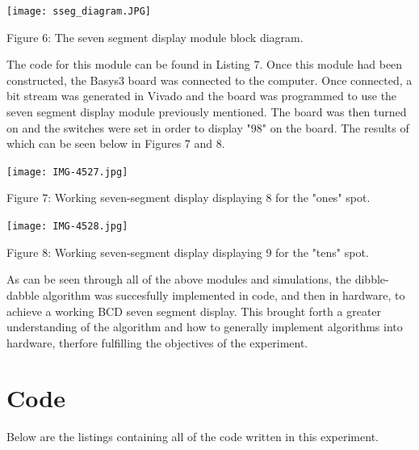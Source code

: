 \documentclass[11pt]{article}
\newcommand{\Verilog}[2][]{%
	
}
\begin{document}
\begin{center}
	\texttt{[image: sseg\_diagram.JPG]}
	
	Figure 6: The seven segment display module block diagram.
	
	
\end{center}

The code for this module can be found in Listing 7. Once this module had been constructed, the Basys3 board was connected to the computer. Once connected, a bit stream was generated in Vivado and the board was programmed to use the seven segment display module previously mentioned. The board was then turned on and the switches were set in order to display "98" on the board. The results of which can be seen below in Figures 7 and 8.

\begin{center}
	\texttt{[image: IMG-4527.jpg]}
	
	Figure 7: Working seven-segment display displaying 8 for the "ones" spot.
	
	\texttt{[image: IMG-4528.jpg]}
	
	Figure 8: Working seven-segment display displaying 9 for the "tens" spot.
	
	
\end{center}

As can be seen through all of the above modules and simulations, the dibble-dabble algorithm was succesfully implemented in code, and then in hardware, to achieve a working BCD seven segment display. This brought forth a greater understanding of the algorithm and how to generally implement algorithms into hardware, therfore fulfilling the objectives of the experiment.


\clearpage

\section*{Code}

Below are the listings containing all of the code written in this experiment.

\Verilog[caption=Code for the Add 3 module]{add3.sv}

\Verilog[caption=Code for the Add 3 Testbench]{add3_test.sv}

\clearpage

\Verilog[caption=Code for the 6-bit BCD module]{BCD_6b.sv}

\clearpage

\Verilog[caption=Code for the 6-bit BCD Testbench]{BCd_6b_test.sv}

\clearpage

\Verilog[caption=Code for the 11-bit BCD module]{bcd11.sv}

\clearpage

\Verilog[caption=Code for the 11-bit BCD Testbench]{bcd11_test.sv}

\clearpage

\Verilog[caption=Code for the seven-segment top level module]{sseg1_BCD.sv}
\end{document}
